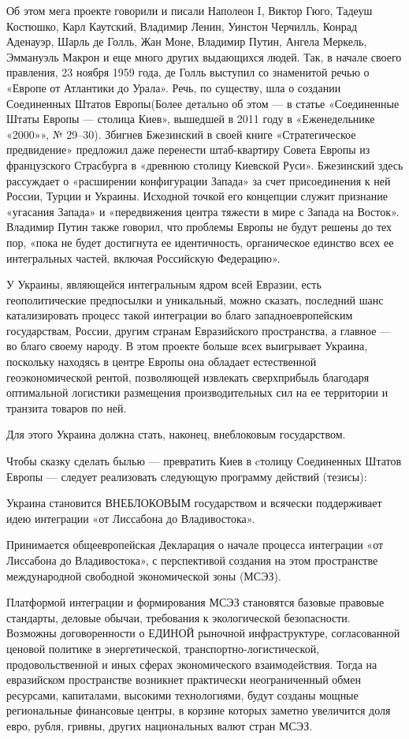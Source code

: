 Об этом мега проекте говорили и писали Наполеон I, Виктор Гюго, Тадеуш
Костюшко, Карл Каутский, Владимир Ленин, Уинстон Черчилль, Конрад Аденауэр,
Шарль де Голль, Жан Моне, Владимир Путин, Ангела Меркель, Эммануэль Макрон и
еще много других выдающихся людей. Так, в начале своего правления, 23 ноября
1959 года, де Голль выступил со знаменитой речью о «Европе от Атлантики до
Урала». Речь, по существу, шла о создании Соединенных Штатов Европы(Более
детально об этом — в статье «Соединенные Штаты Европы — столица Киев», вышедшей
в 2011 году в «Еженедельнике «2000»», № 29–30). Збигнев Бжезинский в своей
книге «Стратегическое предвидение» предложил даже перенести штаб-квартиру
Совета Европы из французского Страсбурга в «древнюю столицу Киевской Руси».
Бжезинский здесь рассуждает о «расширении конфигурации Запада» за счет
присоединения к ней России, Турции и Украины. Исходной точкой его концепции
служит признание «угасания Запада» и «передвижения центра тяжести в мире с
Запада на Восток». Владимир Путин также говорил, что проблемы Европы не будут
решены до тех пор, «пока не будет достигнута ее идентичность, органическое
единство всех ее интегральных частей, включая Российскую Федерацию».

У Украины, являющейся интегральным ядром всей Евразии, есть геополитические
предпосылки и уникальный, можно сказать, последний шанс катализировать процесс
такой интеграции во благо западноевропейским государствам, России, другим
странам Евразийского пространства, а главное — во благо своему народу. В этом
проекте больше всех выигрывает Украина, поскольку находясь в центре Европы она
обладает естественной геоэкономической рентой, позволяющей извлекать
сверхприбыль благодаря оптимальной логистики размещения производительных сил на
ее территории и транзита товаров по ней.

Для этого Украина должна стать, наконец, внеблоковым государством.

Чтобы сказку сделать былью — превратить Киев в cтолицу Соединенных Штатов Европы — следует реализовать следующую программу действий (тезисы):

Украина становится ВНЕБЛОКОВЫМ государством и всячески поддерживает идею
интеграции «от Лиссабона до Владивостока».

Принимается общеевропейская Декларация о начале процесса интеграции «от
Лиссабона до Владивостока», с перспективой создания на этом пространстве
международной свободной экономической зоны (МСЭЗ).

Платформой интеграции и формирования МСЭЗ становятся базовые правовые
стандарты, деловые обычаи, требования к экологической безопасности. Возможны
договоренности о ЕДИНОЙ рыночной инфраструктуре, согласованной ценовой политике
в энергетической, транспортно-логистической, продовольственной и иных сферах
экономического взаимодействия. Тогда на евразийском пространстве возникнет
практически неограниченный обмен ресурсами, капиталами, высокими технологиями,
будут созданы мощные региональные финансовые центры, в корзине которых заметно
увеличится доля евро, рубля, гривны, других национальных валют стран МСЭЗ.

